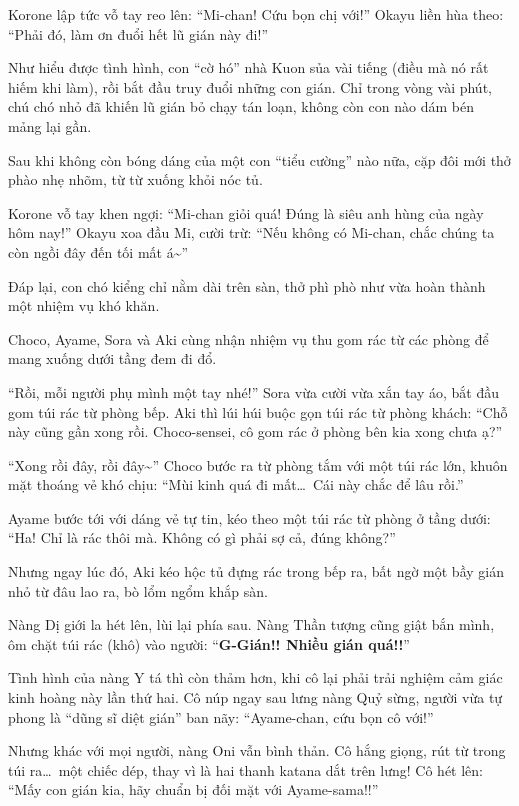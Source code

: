 \documentclass[../main.tex]{subfiles}
\begin{document}
Korone lập tức vỗ tay reo lên: ``Mi-chan! Cứu bọn chị với!'' Okayu liền hùa theo: ``Phải đó, làm ơn đuổi hết lũ gián này đi!''

Như hiểu được tình hình, con ``cờ hó'' nhà Kuon sủa vài tiếng (điều mà nó rất hiếm khi làm), rồi bắt đầu truy đuổi những con gián. Chỉ trong vòng vài phút, chú chó nhỏ đã khiến lũ gián bỏ chạy tán loạn, không còn con nào dám bén mảng lại gần.

Sau khi không còn bóng dáng của một con ``tiểu cường'' nào nữa, cặp đôi mới thở phào nhẹ nhõm, từ từ xuống khỏi nóc tủ.

Korone vỗ tay khen ngợi: ``Mi-chan giỏi quá! Đúng là siêu anh hùng của ngày hôm nay!'' Okayu xoa đầu Mi, cười trừ: ``Nếu không có Mi-chan, chắc chúng ta còn ngồi đây đến tối mất á\~{}''

Đáp lại, con chó kiểng chỉ nằm dài trên sàn, thở phì phò như vừa hoàn thành một nhiệm vụ khó khăn.

\ct

Choco, Ayame, Sora và Aki cùng nhận nhiệm vụ thu gom rác từ các phòng để mang xuống dưới tầng đem đi đổ.

``Rồi, mỗi người phụ mình một tay nhé!'' Sora vừa cười vừa xắn tay áo, bắt đầu gom túi rác từ phòng bếp. Aki thì lúi húi buộc gọn túi rác từ phòng khách: ``Chỗ này cũng gần xong rồi. Choco-sensei, cô gom rác ở phòng bên kia xong chưa ạ?''

``Xong rồi đây, rồi đây\~{}'' Choco bước ra từ phòng tắm với một túi rác lớn, khuôn mặt thoáng vẻ khó chịu: ``Mùi kinh quá đi mất\dots\ Cái này chắc để lâu rồi.''

Ayame bước tới với dáng vẻ tự tin, kéo theo một túi rác từ phòng ở tầng dưới: ``Ha! Chỉ là rác thôi mà. Không có gì phải sợ cả, đúng không?''

Nhưng ngay lúc đó, Aki kéo hộc tủ đựng rác trong bếp ra, bất ngờ một bầy gián nhỏ từ đâu lao ra, bò lổm ngổm khắp sàn.

Nàng Dị giới la hét lên, lùi lại phía sau. Nàng Thần tượng cũng giật bắn mình, ôm chặt túi rác (khô) vào người: ``\textbf{G-Gián!! Nhiều gián quá!!}''

Tình hình của nàng Y tá thì còn thảm hơn, khi cô lại phải trải nghiệm cảm giác kinh hoàng này lần thứ hai. Cô núp ngay sau lưng nàng Quỷ sừng, người vừa tự phong là ``dũng sĩ diệt gián'' ban nãy: ``Ayame-chan, cứu bọn cô với!''

Nhưng khác với mọi người, nàng Oni vẫn bình thản. Cô hắng giọng, rút từ trong túi ra\dots\ một chiếc dép, thay vì là hai thanh katana dắt trên lưng! Cô hét lên: ``Mấy con gián kia, hãy chuẩn bị đối mặt với Ayame-sama!!''
\end{document}
